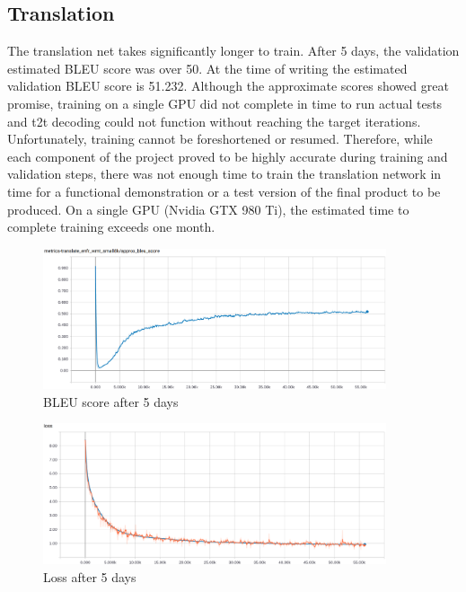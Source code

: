 \documentclass[10pt,a4paper]{article}
\begin{document}
\clearpage

\subsection{Translation}
  
The translation net takes significantly longer to train. After 5 days, the validation estimated BLEU score was over 50. At the time of writing the estimated validation BLEU score is 51.232. Although the approximate scores showed great promise, training on a single GPU did not complete in time to run actual tests and t2t decoding could not function without reaching the target iterations. Unfortunately, training cannot be foreshortened or resumed. Therefore, while each component of the project proved to be highly accurate during training and validation steps, there was not enough time to train the translation network in time for a functional demonstration or a test version of the final product to be produced. On a single GPU (Nvidia GTX 980 Ti), the estimated time to complete training exceeds one month.


\begin{figure}[H]
  \begin{center}
    \includegraphics[width=0.9\textwidth] {BLEU.png}
    \caption{BLEU score after 5 days}
  \end{center}
\end{figure}


\begin{figure}[H]
  \begin{center}
    \includegraphics[width=0.9\textwidth] {loss.png}
    \caption{Loss after 5 days}
  \end{center}
\end{figure}
\end{document}
